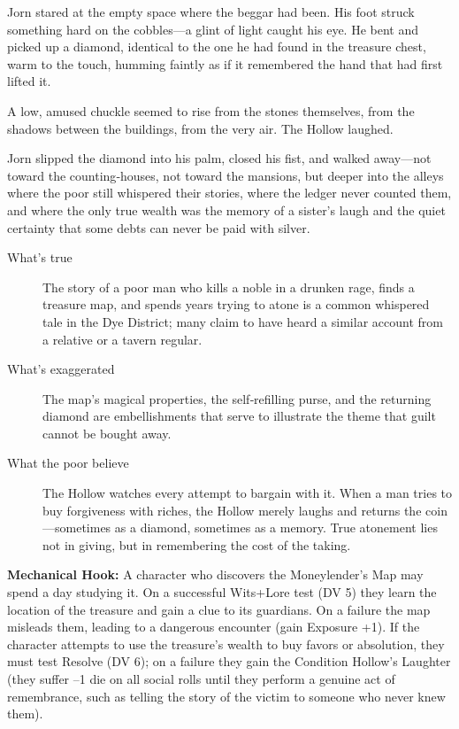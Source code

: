 \documentclass[11pt]{article}
\begin{document}
Jorn stared at the empty space where the beggar had been. His foot struck something hard on the cobbles—a glint of light caught his eye. He bent and picked up a diamond, identical to the one he had found in the treasure chest, warm to the touch, humming faintly as if it remembered the hand that had first lifted it.

A low, amused chuckle seemed to rise from the stones themselves, from the shadows between the buildings, from the very air. The Hollow laughed.

Jorn slipped the diamond into his palm, closed his fist, and walked away—not toward the counting‑houses, not toward the mansions, but deeper into the alleys where the poor still whispered their stories, where the ledger never counted them, and where the only true wealth was the memory of a sister’s laugh and the quiet certainty that some debts can never be paid with silver.

\begin{description}
\item[What's true] The story of a poor man who kills a noble in a drunken rage, finds a treasure map, and spends years trying to atone is a common whispered tale in the Dye District; many claim to have heard a similar account from a relative or a tavern regular.
\item[What's exaggerated] The map’s magical properties, the self‑refilling purse, and the returning diamond are embellishments that serve to illustrate the theme that guilt cannot be bought away.
\item[What the poor believe] The Hollow watches every attempt to bargain with it. When a man tries to buy forgiveness with riches, the Hollow merely laughs and returns the coin—sometimes as a diamond, sometimes as a memory. True atonement lies not in giving, but in remembering the cost of the taking.
\end{description}

\textbf{Mechanical Hook:} A character who discovers the Moneylender's Map may spend a day studying it. On a successful Wits+Lore test (DV 5) they learn the location of the treasure and gain a clue to its guardians. On a failure the map misleads them, leading to a dangerous encounter (gain Exposure +1). If the character attempts to use the treasure’s wealth to buy favors or absolution, they must test Resolve (DV 6); on a failure they gain the Condition Hollow’s Laughter (they suffer –1 die on all social rolls until they perform a genuine act of remembrance, such as telling the story of the victim to someone who never knew them).
\end{document}
